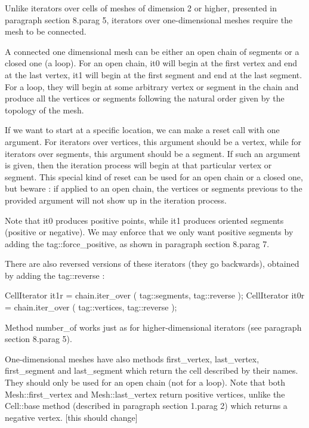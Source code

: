 {Unlike iterators over cells of meshes of dimension 2 or higher, presented in paragraph
\numb section 8.\numb parag 5, iterators over one-dimensional meshes require the mesh
to be connected.

A connected one dimensional mesh can be either an open chain of segments or a closed one
(a loop).
For an open chain, {\codett it0} will begin at the first vertex and end at the last vertex,
{\codett it1} will begin at the first segment and end at the last segment.
For a loop, they will begin at some arbitrary vertex or segment in the chain and produce
all the vertices or segments following the natural order given by the topology of the mesh.

If we want to start at a specific location, we can make a {\codett reset} call with
one argument.
For iterators over vertices, this argument should be a vertex, while for iterators
over segments, this argument should be a segment.
If such an argument is given, then the iteration process will begin at that particular
vertex or segment.
This special kind of {\codett reset} can be used for an open chain or a closed one,
but beware : if applied to an open chain, the vertices or segments previous to the provided
argument will not show up in the iteration process.

Note that {\codett it0} produces positive points, while {\codett  it1} produces
oriented segments (positive or negative).
We may enforce that we only want positive segments by adding the {\codett tag::force\_positive},
as shown in paragraph \numb section 8.\numb parag 7.

There are also reversed versions of these iterators (they go backwards), obtained by adding
the {\codett tag::reverse} :

\verbatim
   CellIterator it1r = chain.iter_over ( tag::segments, tag::reverse );
   CellIterator it0r = chain.iter_over ( tag::vertices, tag::reverse );
\endverbatim

Method {\codett number\_of} works just as for higher-dimensional iterators (see paragraph
\numb section 8.\numb parag 5).

One-dimensional meshes have also methods {\codett first\_vertex}, {\codett last\_vertex},
{\codett first\_segment} and {\codett last\_segment} which return the cell described by their
names.
They should only be used for an open chain (not for a loop).
Note that both {\codett Mesh::first\_vertex} and {\codett Mesh::last\_vertex} return
positive vertices, unlike the {\codett Cell::base} method (described in paragraph
\numb section 1.\numb parag 2) which returns a negative vertex. [this should change]

}
